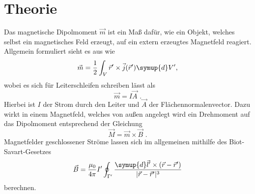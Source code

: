 \section{Theorie}
\label{sec:Theorie}

Das magnetische Dipolmoment $\vec{m}$ ist ein Maß dafür, wie ein Objekt, welches selbst ein magnetisches Feld erzeugt, auf ein extern erzeugtes
Magnetfeld reagiert. Allgemein formuliert sieht es aus wie
\begin{equation}
    \vec{m}=\frac{1}{2}\int_{V}\vec{r}'\times\vec{j}(\vec{r}')\symup{d}V' \text{,}
\end{equation}
wobei es sich für Leiterschleifen schreiben lässt als
\begin{equation}
    \vec{m}=I\vec{A}\text{ .}
\end{equation}
Hierbei ist $I$ der Strom durch den Leiter und $\vec{A}$ der Flächennormalenvector. Dazu wirkt in einem Magnetfeld,
welches von außen angelegt wird ein Drehmoment auf das Dipolmoment entsprechend der Gleichung
\begin{equation}
    \vec{M}=\vec{m}\times\vec{B}\text{ .}
    \label{eqn:MagDreh}
\end{equation}
Magnetfelder geschlossener Ströme lassen sich im allgemeinen mithilfe des Biot-Savart-Gesetzes
\begin{equation}
    \vec{B}=\frac{\mu_0}{4\pi}I'\oint_{\Gamma'}\frac{\symup{d}\vec{l}'\times(\vec{r}-\vec{r}')}{|\vec{r}-\vec{r}'|^3}
    \label{eqn:Biot}
\end{equation} 
berechnen. \\


